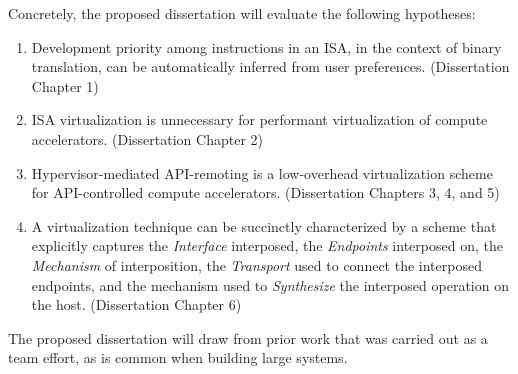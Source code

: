 \noindent Concretely, the proposed dissertation will evaluate the following
hypotheses:
\begin{enumerate}[noitemsep, topsep=0pt, leftmargin=1em, labelwidth=*, align=left, label=\textbf{H \arabic*:}]
\item Development priority among instructions in an ISA, in the context of binary translation, can be automatically inferred from user preferences. (Dissertation Chapter 1)
\item ISA virtualization is unnecessary for performant virtualization of compute accelerators. (Dissertation Chapter 2)
\item Hypervisor-mediated API-remoting is a low-overhead virtualization scheme for API-controlled compute accelerators. (Dissertation Chapters 3, 4, and 5)
\item A virtualization technique can be succinctly characterized by a scheme
that explicitly captures the \textit{Interface} interposed,
the \textit{Endpoints} interposed on, the \textit{Mechanism} of
interposition, the \textit{Transport} used to connect the interposed
endpoints, and the mechanism used to \textit{Synthesize} the interposed
operation on the host. (Dissertation Chapter 6)
\end{enumerate}

The proposed dissertation will draw from prior work that was carried out as a
team effort, as is common when building large systems.